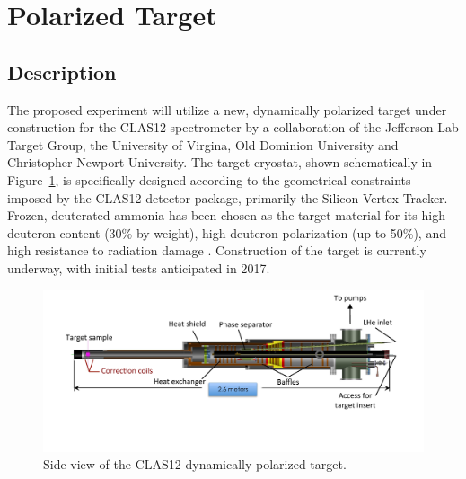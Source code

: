 \documentclass[preprint,12pt]{elsarticle}
\begin{document}




\newcommand{\plus}{\raisebox{.3\height}{\scalebox{.6}{+}}}
\newcommand{\minus}{\raisebox{0\height}{\scalebox{1}{-}}}
\section{Polarized Target} \label{Target}
\subsection{Description} \label{Description}
The proposed experiment will utilize a new, dynamically polarized target under construction for the CLAS12 spectrometer by a collaboration of the Jefferson Lab Target Group, the University of Virgina, Old Dominion University and Christopher Newport University.  The target cryostat, shown schematically in Figure~\ref{Target}, is specifically designed according to the geometrical constraints imposed by the CLAS12 detector package, primarily the Silicon Vertex Tracker.  Frozen, deuterated ammonia has been chosen as the target material for its high deuteron content (30\% by weight), high deuteron polarization (up to 50\%), and high resistance to radiation damage \cite{Goertz2002}.  Construction of the target is currently underway, with initial tests anticipated in 2017.

\begin{figure}
\begin{center}
\includegraphics[width=5.5in]{Target_Side.pdf}
\end{center}
\caption{Side view of the CLAS12 dynamically polarized target.}
\label{Target}
\end{figure}
\end{document}
